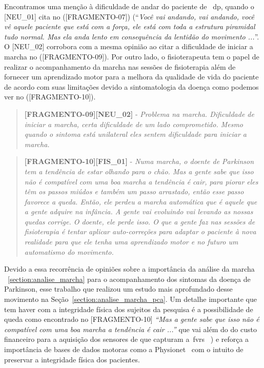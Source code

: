 Encontramos uma menção à dificuldade de andar do paciente de ~\ac{dp}, quando o [NEU\_01] cita no ([FRAGMENTO-07]) (``\textit{Você vai andando, vai andando, você vê aquele paciente que está com a força, ele está com toda a estrutura piramidal tudo normal. Mas ela anda lento em consequência da lentidão do movimento ...}''. O [NEU\_02] corrobora com a mesma opinião ao citar a dificuldade de iniciar a marcha no ([FRAGMENTO-09]).
Por outro lado, o fisioterapeuta tem o papel de realizar o acompanhamento da marcha nas sessões de fisioterapia além de fornecer um aprendizado motor para a melhora da qualidade de vida do paciente de acordo com suas limitações devido a sintomatologia da doença como podemos ver no ([FRAGMENTO-10]).

\begin{quote}
\textbf{[FRAGMENTO-09][NEU\_02]} - 
\emph{
Problema na marcha. Dificuldade de iniciar a marcha, certa dificuldade de um lado comprometido. Mesmo quando o sintoma está unilateral eles sentem dificuldade para iniciar a marcha.
}
\end{quote}

\begin{quote}
\textbf{[FRAGMENTO-10][FIS\_01]} - 
\emph{
Numa marcha, o doente de Parkinson tem a tendência de estar olhando para o chão. Mas a gente sabe que isso não é compatível com uma boa marcha a tendência é cair, para piorar eles têm os passos miúdos e também um passo arrastado, então esse passo favorece a queda. Então, ele perdeu a marcha automática que é aquele que a gente adquire na infância. A gente vai evoluindo vai levando as nossas quedas  corrige.  O doente, ele perde isso. O que a gente faz nas sessões de fisioterapia é tentar aplicar auto-correções para adaptar o paciente à nova realidade para que ele tenha uma aprendizado motor e no futuro um automatismo do movimento.
}
\end{quote}

Devido a essa recorrência de opiniões sobre a importância da análise da marcha ~\ref{section:analise_marcha} para o acompanhamento dos sintomas da doença de Parkinson, esse trabalho que realizou um estudo mais aprofundado desse movimento na Seção~\ref{section:analise_marcha_pca}. Um detalhe importante que tem haver com a integridade física dos sujeitos da pesquisa é a possibilidade de queda como encontrado no [FRAGMENTO-10] \textit{``Mas a gente sabe que isso não é compatível com uma boa marcha a tendência é cair ...''} que vai além do do custo financeiro para a aquisição dos sensores de que capturam a~\ac{fvrs} ~\cite{dyno}) e reforça a importância de bases de dados motoras como a Physionet~\cite{physionet} com o intuito de preservar a integridade física dos pacientes.



